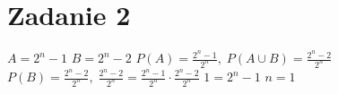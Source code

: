 \documentclass{article}
\begin{document}
\section*{Zadanie 2}
$A=2^n-1$\newline\newline
$B=2^n-2$\newline\newline
$P(A)=\frac{2^n-1}{2^n},\;P(A\cup{B})=\frac{2^n-2}{2^n}$\newline\newline
$P(B)=\frac{2^n-2}{2^n},\;\frac{2^n-2}{2^n}=\frac{2^n-1}{2^n}\cdot{\frac{2^n-2}{2^n}}$\newline\newline
$1=2^n-1$\newline\newline
$n=1$
\end{document}
